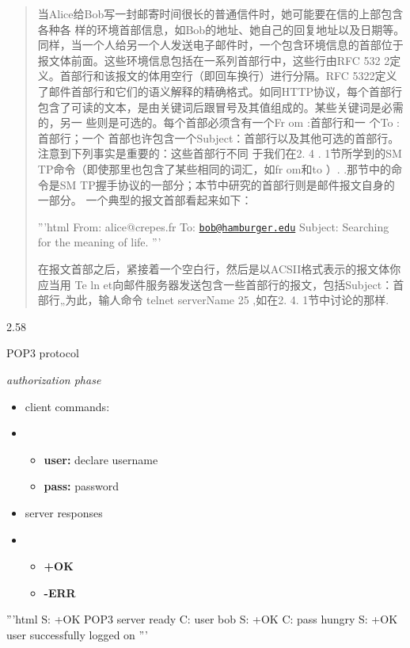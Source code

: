 \documentclass[
]{article}
\begin{document}
\begin{quote}
当Alice给Bob写一封邮寄时间很长的普通信件时，她可能要在信的上部包含各种各
样的环境首部信息，如Bob的地址、她自己的回复地址以及日期等。同样，当一个人给另一个人发送电子邮件时，一个包含环境信息的首部位于报文体前面。这些环境信息包括在一系列首部行中，这些行由RFC
532 2定义。首部行和该报文的体用空行（即回车换行）进行分隔。RFC
5322定义了邮件首部行和它们的语义解释的精确格式。如同HTTP协议，每个首部行包含了可读的文本，是由关键词后跟冒号及其值组成的。某些关键词是必需的，另一
些则是可选的。每个首部必须含有一个Fr om :首部行和一 个To :首部行；一个
首部也许包含一个Subject：首部行以及其他可选的首部行。注意到下列事实是重要的：这些首部行不同
于我们在2. 4 . 1节所学到的SM
TP命令（即使那里也包含了某些相同的词汇，如fr om和to ）.
.那节中的命令是SM
TP握手协议的一部分；本节中研究的首部行则是邮件报文自身的一部分。
一个典型的报文首部看起来如下：

'''html From: alice@crepes.fr To:
\href{mailto:bob@hamburger.edu}{\nolinkurl{bob@hamburger.edu}} Subject:
Searching for the meaning of life. '''

在报文首部之后，紧接着一个空白行，然后是以ACSII格式表示的报文体你应当用
Te ln
et向邮件服务器发送包含一些首部行的报文，包括Subject：首部行„为此，输人命令
telnet serverName 25 ,如在2. 4. 1节中讨论的那样.
\end{quote}

2.58

POP3 protocol

\emph{authorization phase}

\begin{itemize}
\item
  client commands:
\item
  \begin{itemize}
  \item
    \textbf{user:} declare username
  \item
    \textbf{pass:} password
  \end{itemize}
\item
  server responses
\item
  \begin{itemize}
  \item
    \textbf{+OK}
  \item
    \textbf{-ERR}
  \end{itemize}
\end{itemize}

'''html S: +OK POP3 server ready C: user bob S: +OK C: pass hungry S:
+OK user successfully logged on '''
\end{document}
